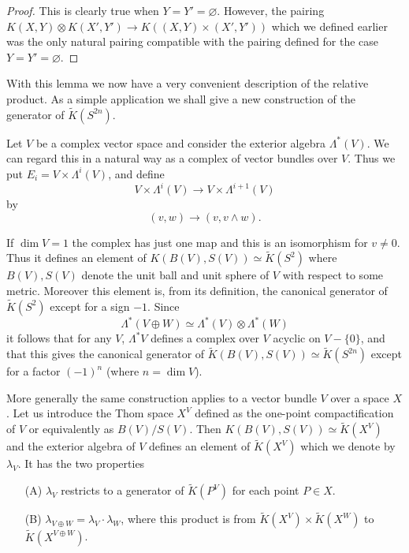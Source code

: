 \documentclass[leqno]{book}
\numberwithin{equation}{section}
\theoremstyle{definition}
\begin{document}
            \begin{proof}
                This is clearly true when $Y=Y'=\varnothing$. However, the pairing $K(X,Y)\otimes K(X',Y')\to K((X,Y)\times (X',Y'))$ which we defined earlier was the only natural pairing compatible with the pairing defined for the case $Y=Y'=\varnothing$.
            \end{proof}

            With this lemma we now have a very convenient description of the relative product. As a simple application we shall give a new construction of the generator of $\tilde{K}(S^{2n})$.

            Let $V$ be a complex vector space and consider the exterior algebra $\Lambda^{*}(V)$. We can regard this in a natural way as a complex of vector bundles over $V$. Thus we put $E_{i}=V\times \Lambda^{i}(V)$, and define
            \begin{equation*}
              V\times \Lambda^{i}(V)\to V\times \Lambda^{i+1}(V)
            \end{equation*}
            by 
            \begin{equation*}
              (v,w)\to (v,v\wedge w).
            \end{equation*}

            If $\operatorname{dim}V=1$ the complex has just one map and this is an isomorphism for $v\neq 0$. Thus it defines an element of $K(B(V),S(V))\simeq \tilde{K}(S^{2})$ where $B(V),S(V)$ denote the unit ball and unit sphere of $V$ with respect to some metric. Moreover this element is, from its definition, the canonical generator of $\tilde{K}(S^{2})$ except for a sign $-1$. Since
            \begin{equation*}
              \Lambda^{*}(V\oplus W)\simeq \Lambda^{*}(V)\otimes \Lambda^{*}(W)
            \end{equation*}
            it follows that for any $V$, $\Lambda^{*}V$ defines a complex over $V$ acyclic on $V-\{0\}$, and that this gives the canonical generator of $\tilde{K}(B(V),S(V))\simeq \tilde{K}(S^{2n})$ except for a factor $(-1)^{n}$ (where $n=\operatorname{dim}V$).

            More generally the same construction applies to a vector bundle $V$ over a space $X$. Let us introduce the Thom space $X^{V}$ defined as the one-point compactification of $V$ or equivalently as $B(V)/S(V)$. Then $K(B(V),S(V))\simeq \tilde{K}(X^{V})$ and the exterior algebra of $V$ defines an element of $\tilde{K}(X^{V})$ which we denote by $\lambda_{V}$. It has the two properties
            \begin{itemize}
              \item[(A)] $\lambda_{V}$ restricts to a generator of $\tilde{K}(P^{V})$ for each point $P \in X$.
              \item[(B)] $\lambda_{V\oplus W}=\lambda_{V}\cdot \lambda_{W}$, where this product is from $\tilde{K}(X^{V})\times \tilde{K}(X^{W})$ to $\tilde{K}(X^{V\oplus W})$.
            \end{itemize}
\end{document}
